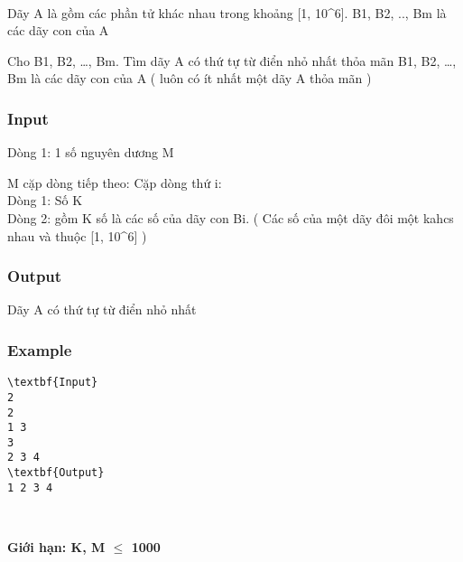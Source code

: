 

 

Dãy A là gồm các phần tử khác nhau trong khoảng [1, 10\textasciicircum6]. B1, B2, .., Bm là các dãy con của A

Cho B1, B2, …, Bm. Tìm dãy A có thứ tự từ điển nhỏ nhất thỏa mãn B1, B2, …, Bm là các dãy con của A ( luôn có ít nhất một dãy A thỏa mãn )

\subsubsection{Input}

Dòng 1: 1 số nguyên dương M

M cặp dòng tiếp theo: Cặp dòng thứ i:
\\Dòng 1: Số K
\\Dòng 2: gồm K số là các số của dãy con Bi. ( Các số của một dãy đôi một kahcs nhau và thuộc [1, 10\textasciicircum6] )

\subsubsection{Output}

Dãy A có thứ tự từ điển nhỏ nhất

\subsubsection{Example}
\begin{verbatim}
\textbf{Input}
2
2
1 3
3
2 3 4
\textbf{Output}
1 2 3 4\end{verbatim}

 

\textbf{Giới hạn: K, M  $\le$  1000}
